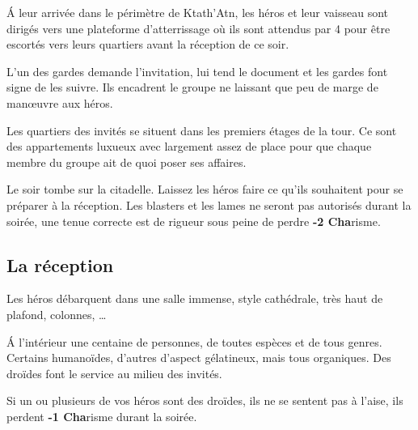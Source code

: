 \'A leur arrivée dans le périmètre de Ktath’Atn, les héros et leur vaisseau sont dirigés vers une plateforme d’atterrissage où ils sont attendus par 4  pour être escortés vers leurs quartiers avant la réception de ce soir.

L’un des gardes demande l’invitation,  lui tend le document et les gardes font signe de les suivre. Ils encadrent le groupe ne laissant que peu de marge de manœuvre aux héros.

Les quartiers des invités se situent dans les premiers étages de la tour. Ce sont des appartements luxueux avec largement assez de place pour que chaque membre du groupe ait de quoi poser ses affaires.

Le soir tombe sur la citadelle. Laissez les héros faire ce qu’ils souhaitent pour se préparer à la réception. Les blasters et les lames ne seront pas autorisés durant la soirée, une tenue correcte est de rigueur sous peine de perdre \textbf{-2 Cha}risme. 

\subsection{La réception}

Les héros débarquent dans une salle immense, style cathédrale, très haut de plafond, colonnes, \dots

\'A l’intérieur une centaine de personnes, de toutes espèces et de tous genres. Certains humanoïdes, d’autres d’aspect gélatineux, mais tous organiques. Des droïdes font le service au milieu des invités. 

Si un ou plusieurs de vos héros sont des droïdes, ils ne se sentent pas à l’aise, ils perdent \textbf{-1 Cha}risme durant la soirée.

